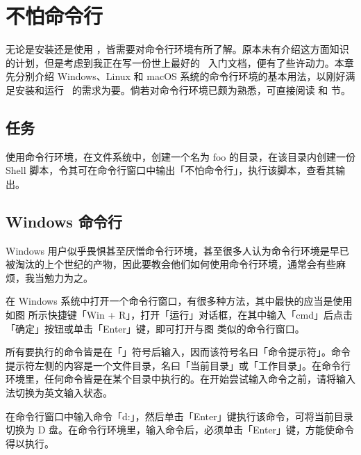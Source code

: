\chapter[Installation]{不怕命令行 }

无论是安装还是使用 \ConTeXt，皆需要对命令行环境有所了解。原本未有介绍这方面知识的计划，但是考虑到我正在写一份世上最好的 \ConTeXt\ 入门文档，便有了些许动力。本章先分别介绍 Windows、Linux 和 macOS 系统的命令行环境的基本用法，以刚好满足安装和运行 \ConTeXt\ 的需求为要。倘若对命令行环境已颇为熟悉，可直接阅读 \in[installation] 和  节。

\section{任务}

使用命令行环境，在文件系统中，创建一个名为 foo 的目录，在该目录内创建一份 Shell 脚本，令其可在命令行窗口中输出「不怕命令行」，执行该脚本，查看其输出。

\section{Windows 命令行}

Windows 用户似乎畏惧甚至厌憎命令行环境，甚至很多人认为命令行环境是早已被淘汰的上个世纪的产物，因此要教会他们如何使用命令行环境，通常会有些麻烦，我当勉力为之。

在 Windows 系统中打开一个命令行窗口，有很多种方法，其中最快的应当是使用如图 \in[win-r] 所示快捷键「Win + R」，打开「运行」对话框，在其中输入「cmd」后点击「确定」按钮或单击「Enter」键，即可打开与图  类似的命令行窗口。

\startplacefigure[location=none]
\startfloatcombination[nx=2,ny=1]
\startplacefigure[title={「\type{Win + R}」 组合键},reference=win-r]
\stopplacefigure
\startplacefigure[title={Windows 命令行窗口},reference=cmd-window]
\stopplacefigure
\stopfloatcombination
\stopplacefigure

所有要执行的命令皆是在「\type{>}」符号后输入，因而该符号名曰「命令提示符」。命令提示符左侧的内容是一个文件目录，名曰「当前目录」或「工作目录」。在命令行环境里，任何命令皆是在某个目录中执行的。在开始尝试输入命令之前，请将输入法切换为英文输入状态。

在命令行窗口中输入命令「d:」，然后单击「Enter」键执行该命令，可将当前目录切换为 D 盘。在命令行环境里，输入命令后，必须单击「Enter」键，方能使命令得以执行。

